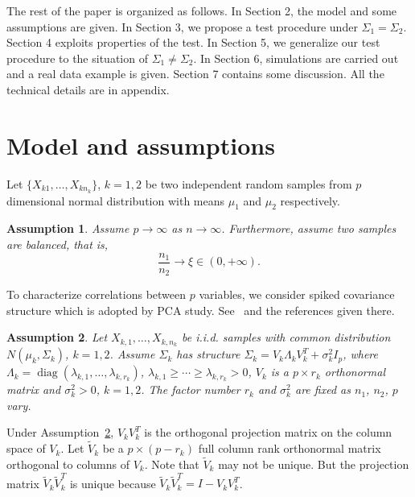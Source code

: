\documentclass[review]{elsarticle}
\DeclareMathOperator{\mydiag}{diag}
\theoremstyle{plain}
\newtheorem{assumption}{\quad\quad Assumption}
\theoremstyle{definition}
\theoremstyle{remark}
\begin{document}
The rest of the paper is organized as follows. In Section 2,  the model and some assumptions are given.  In Section 3, we propose a test procedure under $\Sigma_1=\Sigma_2$. Section 4 exploits properties of the test. In Section 5, we generalize our test procedure to the situation of $\Sigma_1\neq \Sigma_2$. In Section 6, simulations are carried out and  a real data example is given. Section 7 contains some discussion. All the technical details are in appendix.

\section{Model and assumptions}


Let $\{X_{k1},\ldots,X_{kn_k}\}$, $k=1, 2$ be two independent  random samples from $p$ dimensional normal distribution with means $\mu_1$ and $\mu_2$ respectively.

\begin{assumption}\label{balance}
Assume $p\to \infty$ as $n\to \infty$. Furthermore, assume two samples are balanced, that is,
\begin{equation*}
    \frac{n_1}{n_2}\to \xi \in (0,+\infty).
\end{equation*}
\end{assumption}

To characterize correlations between $p$ variables, we consider spiked covariance structure which is adopted by PCA study. See~\cite{Cai2012Sparse} and the references given there.
\begin{assumption}\label{theModel}
    Let $X_{k,1},\ldots, X_{k, n_k}$  be i.i.d. samples with common distribution $N(\mu_k,\Sigma_k)$, $k=1,2$. 
    Assume $\Sigma_k$ has structure $ 
\Sigma_k=V_k\Lambda_k V_k^T+\sigma^2_k I_p
$, where $\Lambda_k=\mydiag(\lambda_{k,1},\ldots,\lambda_{k,{r_k}})$, 
 $\lambda_{k,1}\geq \cdots \geq \lambda_{k,{r_k}}>0$,
$V_k$ is  a $p\times r_k$ orthonormal matrix and $\sigma^2_k>0$, $k=1,2$. The factor number $r_k$ and $\sigma^2_k$ are fixed as $n_1$, $n_2$, $p$ vary.
\end{assumption}

Under Assumption~\ref{theModel}, $V_k V_k^T$ is the orthogonal projection matrix on the column space of $V_k$. Let $\tilde{V}_k$ be a $p\times (p-r_k)$ full column rank orthonormal matrix orthogonal to columns of  $V_k$.
 Note that $\tilde{V}_k$ may not be unique. But the projection matrix $\tilde{V}_k\tilde{V}_k^T$ is unique because $\tilde{V}_k\tilde{V}_k^T=I-V_k V_k^T$.
\end{document}
